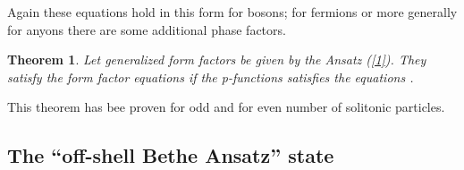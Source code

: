 \documentclass[a4paper,12pt]{article}
\newtheorem{theorem}{Theorem}{}
\begin{document}
Again these equations hold in this form for bosons; for fermions or more
generally for anyons there are some additional phase factors.

\begin{theorem}
Let generalized form factors be given by the Ansatz (\ref{1}). They satisfy
the form factor equations \coordHE{} if the p-functions \coordHE{} satisfies the equations \coordHE{}.
\end{theorem}

This theorem has bee proven for odd \cite{BFKZ} and for even \cite{BK} number
of solitonic particles.

\subsection*{The ``off-shell Bethe Ansatz'' state}
\end{document}

